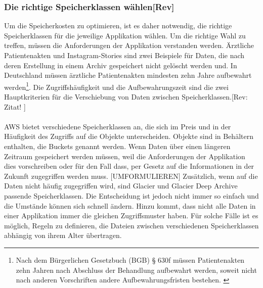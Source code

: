 \subsubsection{Die richtige Speicherklassen wählen[Rev]}
Um die Speicherkosten zu optimieren, ist es daher notwendig, die richtige Speicherklassen für die jeweilige Applikation wählen. Um die richtige Wahl zu treffen, müssen die Anforderungen der Applikation verstanden werden. Ärztliche Patientenakten und Instagram-Stories sind zwei Beispiele für Daten, die nach deren Erstellung in einem Archiv gespeichert nicht gelöscht werden und. In Deutschland müssen ärztliche Patientenakten mindesten zehn Jahre aufbewahrt werden\footnote{Nach dem Bürgerlichen Gesetzbuch (BGB) § 630f müssen Patientenakten zehn Jahren nach Abschluss der Behandlung aufbewahrt werden, soweit nicht nach anderen Vorschriften andere Aufbewahrungsfristen bestehen. \cite{BGB}}. %
Die Zugriffshäufigkeit und die Aufbewahrungszeit sind die zwei Hauptkriterien für die Verschiebung von Daten zwischen Speicherklassen.[Rev: Zitat! ]
\\\\
AWS bietet verschiedene Speicherklassen an, die sich im Preis und in der Häufigkeit des Zugriffs auf die Objekte unterscheiden. Objekte sind in Behältern enthalten, die Buckets genannt werden. Wenn Daten über einen längeren Zeitraum gespeichert werden müssen, weil die Anforderungen der Applikation dies vorschreiben oder für den Fall dass, per Gesetz auf die Informationen in der Zukunft zugegriffen werden muss.
[UMFORMULIEREN]
Zusätzlich, wenn auf die Daten nicht häufig zugegriffen wird, sind Glacier und Glacier Deep Archive passende Speicherklassen. Die Entscheidung ist jedoch nicht immer so einfach und die Umstände können sich schnell ändern. Hinzu kommt, dass nicht alle Daten in einer Applikation immer die gleichen Zugriffsmuster haben. Für solche Fälle ist es möglich, Regeln zu definieren, die Dateien zwischen verschiedenen Speicherklassen abhängig von ihrem Alter übertragen.

